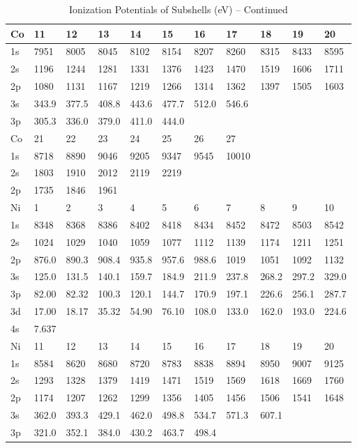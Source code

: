 \begin{table}
\begin{center}
\addtocounter{table}{-1}
\caption{Ionization Potentials of Subshells (eV) -- Continued}
\begin{tabular}{lllllllllll}
\hline
Co& 11&  12&  13&  14&  15&  16&  17&  18&  19&  20\\
\hline
1s&  7951&  8005&  8045&  8102&  8154&
8207&  8260&  8315&  8433&  8595\\
2s&  1196&  1244&  1281&  1331&  1376&  1423&  1470&
1519&  1606&  1711\\
2p&  1080&  1131&  1167&  1219&  1266&  1314&  1362&  1397&  1505&
1603\\
3s& 343.9& 377.5& 408.8& 443.6& 477.7& 512.0& 546.6\\
3p& 305.3& 336.0& 379.0&
411.0&
444.0\\
Co& 21& 22&  23&  24&  25&  26&  27\\
1s&  8718&  8890&  9046&  9205&  9347&  9545&
10010\\
2s&  1803&  1910&  2012&  2119&  2219\\
2p&  1735&  1846&  1961\\
\hline
Ni& 1& 2&  3& 4&   5&   6&   7&   8&   9&  10\\
\hline
1s&  8348&  8368&  8386&  8402&  8418&  8434&  8452&  8472&
8503&  8542\\
2s&  1024&  1029&  1040&  1059&  1077&  1112&  1139&  1174&  1211&  1251\\
2p&
876.0& 890.3& 908.4& 935.8& 957.6& 988.6& 1019& 1051& 1092& 1132\\
3s& 125.0& 131.5&
140.1& 159.7& 184.9& 211.9& 237.8& 268.2& 297.2& 329.0\\
3p& 82.00& 82.32& 100.3& 120.1&
144.7& 170.9& 197.1& 226.6& 256.1& 287.7\\
3d& 17.00& 18.17& 35.32& 54.90& 76.10& 108.0&
133.0& 162.0& 193.0& 224.6\\
4s& 7.637\\
\hline
Ni&  11&  12&  13&  14&  15&  16&  17&  18&  19&  20\\
\hline
1s&
8584&  8620&  8680&  8720&  8783&  8838&  8894&  8950&  9007&  9125\\
2s&  1293&  1328&
1379&  1419&  1471&  1519&  1569&  1618&  1669&  1760\\
2p&  1174&  1207&  1262&  1299&
1356&  1405&  1456&  1506&  1541&  1648\\
3s& 362.0& 393.3& 429.1& 462.0& 498.8& 534.7&
571.3& 607.1\\
3p& 321.0& 352.1& 384.0& 430.2& 463.7& 498.4\\

\end{tabular}
\end{center}
\end{table}
